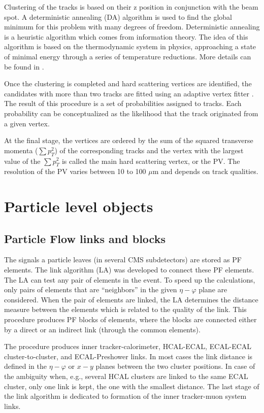 Clustering of the tracks is based on their z position in conjunction with the beam spot. A deterministic annealing (DA) algorithm is used to find the global minimum for this problem with many degrees of freedom. Deterministic annealing is a heuristic algorithm which comes from information theory. The idea of this algorithm is based on the thermodynamic system in physics, approaching a state of minimal energy through a series of temperature reductions. More details can be found in \cite{DeterministicAnnealing}. 

Once the clustering is completed and hard scattering vertices are identified, the candidates with more than two tracks are fitted using an adaptive vertex fitter \cite{AdaptiveVertexFitting}. The result of this procedure is a set of probabilities assigned to tracks. Each probability can be conceptualized as the likelihood that the track originated from a given vertex.

At the final stage, the vertices are ordered by the sum of the squared transverse momenta ($\sum p_T^2$) of the corresponding tracks and the vertex with the largest value of the $\sum p_T^2$ is called the main hard scattering vertex, or the PV. The resolution of the PV varies between 10 to 100 $\mu$m and depends on track qualities. 

\section{Particle level objects}\label{sec:pf_objects}
\subsection{Particle Flow links and blocks}\label{sec:some_reconstruction}

The signals a particle leaves (in several CMS subdetectors) are stored as PF \cite{ParticleFlow} elements. The link algorithm (LA) was developed to connect these PF elements. The LA can test any pair of elements in the event. To speed up the calculations, only pairs of elements that are ``neighbors'' in the given $\eta - \varphi$ plane are considered. When the pair of elements are linked, the LA determines the distance measure between the elements which is related to the quality of the link. This procedure produces PF blocks of elements, where the blocks are connected either by a direct or an indirect link (through the common elements).

The procedure produces inner tracker-calorimeter, HCAL-ECAL, ECAL-ECAL  cluster-to-cluster, and ECAL-Preshower links. In most cases the link distance is defined in the $\eta-\varphi$ or $x-y$ planes between the two cluster positions. In case of the ambiguity when, e.g., several HCAL clusters are linked to the same ECAL cluster, only one link is kept, the one with the smallest distance. The last stage of the link algorithm is dedicated to formation of the inner tracker-muon system links. 

